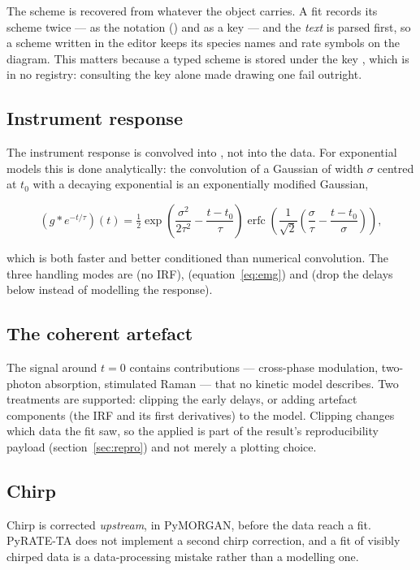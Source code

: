 The scheme is recovered from whatever the object carries. A fit records its
scheme twice --- as the notation () and as a key --- and the
\emph{text} is parsed first, so a scheme written in the editor keeps its species
names and rate symbols on the diagram. This matters because a typed scheme is
stored under the key , which is in no registry: consulting the
key alone made drawing one fail outright.

\subsection{Instrument response}\label{sec:irf}

The instrument response is convolved into \Cmat, not into the data. For
exponential models this is done analytically: the convolution of a Gaussian of
width $\sigma$ centred at $t_0$ with a decaying exponential is an exponentially
modified Gaussian,

\begin{equation}
  \left(g \ast e^{-t/\tau}\right)(t)
  = \tfrac{1}{2}\exp\!\left(\frac{\sigma^{2}}{2\tau^{2}} - \frac{t-t_0}{\tau}\right)
    \operatorname{erfc}\!\left(\frac{1}{\sqrt{2}}\left(\frac{\sigma}{\tau} - \frac{t-t_0}{\sigma}\right)\right),
  \label{eq:emg}
\end{equation}

which is both faster and better conditioned than numerical convolution. The
three handling modes are  (no IRF), 
(equation~\ref{eq:emg}) and  (drop the delays below 
instead of modelling the response).

\subsection{The coherent artefact}

The signal around $t=0$ contains contributions --- cross-phase modulation,
two-photon absorption, stimulated Raman --- that no kinetic model describes.
Two treatments are supported: clipping the early delays, or adding artefact
components (the IRF and its first derivatives) to the model. Clipping changes
which data the fit saw, so the applied  is part of the result's
reproducibility payload (section~\ref{sec:repro}) and not merely a plotting
choice.

\subsection{Chirp}

Chirp is corrected \emph{upstream}, in PyMORGAN, before the data reach a fit.
PyRATE-TA does not implement a second chirp correction, and a fit of visibly
chirped data is a data-processing mistake rather than a modelling one.
